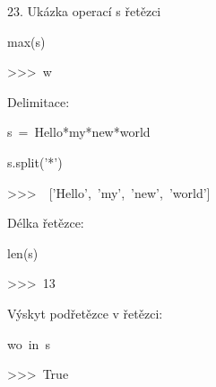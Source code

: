 \documentclass[czech]{beamer}
\newenvironment{lyxcode}
  {\par\begin{list}{}{
    \setlength{\rightmargin}{\leftmargin}
    \setlength{\listparindent}{0pt}%
    \raggedright
    \setlength{\itemsep}{0pt}
    \setlength{\parsep}{0pt}
    \normalfont\ttfamily}%
   \def\{{\char`\{}
   \def\}{\char`\}}
   \def\textasciitilde{\char`\~}
   \item[]}
  {\end{list}}
\begin{document}
\begin{frame}[plain]{23. Ukázka operací s řetězci}
\begin{lyxcode}
{\tiny max(s)}{\tiny\par}

{\tiny >\textcompwordmark >\textcompwordmark >~w}{\tiny\par}
\end{lyxcode}
{\tiny Delimitace:}{\tiny\par}
\begin{lyxcode}
{\tiny s~=~\textquotedbl Hello{*}my{*}new{*}world\textquotedbl}{\tiny\par}

{\tiny s.split('{*}')}{\tiny\par}

{\tiny >\textcompwordmark >\textcompwordmark >~~{[}'Hello',~'my',~'new',~'world'{]}~~~}{\tiny\par}
\end{lyxcode}
{\tiny Délka řetězce:}{\tiny\par}
\begin{lyxcode}
{\tiny len(s)}{\tiny\par}
\begin{lyxcode}
{\tiny >\textcompwordmark >\textcompwordmark >~13}{\tiny\par}
\end{lyxcode}
\end{lyxcode}
{\tiny Výskyt podřetězce v řetězci:}{\tiny\par}
\begin{lyxcode}
{\tiny\textquotedbl wo\textquotedbl ~in~s}{\tiny\par}
\begin{lyxcode}
{\tiny >\textcompwordmark >\textcompwordmark >~True}{\tiny\par}
\end{lyxcode}
\end{lyxcode}
\end{frame}
\end{document}
